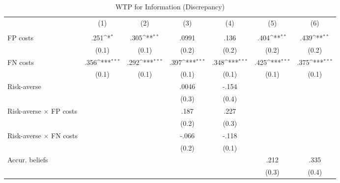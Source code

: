 \begin{table}[htbp]\centering
\def\sym#1{\ifmmode^{#1}\else\(^{#1}\)\fi}
\caption{WTP for Information (Discrepancy)}
\begin{tabular}{l*{6}{c}}
\hline\hline
                &\multicolumn{1}{c}{(1)}&\multicolumn{1}{c}{(2)}&\multicolumn{1}{c}{(3)}&\multicolumn{1}{c}{(4)}&\multicolumn{1}{c}{(5)}&\multicolumn{1}{c}{(6)}\\
                &\multicolumn{1}{c}{}&\multicolumn{1}{c}{}&\multicolumn{1}{c}{}&\multicolumn{1}{c}{}&\multicolumn{1}{c}{}&\multicolumn{1}{c}{}\\
\hline
FP costs        &     .251\sym{*}  &     .305\sym{**} &    .0991         &     .136         &     .404\sym{**} &     .439\sym{**} \\
                &    (0.1)         &    (0.1)         &    (0.2)         &    (0.2)         &    (0.2)         &    (0.2)         \\
FN costs        &     .356\sym{***}&     .292\sym{***}&     .397\sym{***}&     .348\sym{***}&     .425\sym{***}&     .375\sym{***}\\
                &    (0.1)         &    (0.1)         &    (0.1)         &    (0.1)         &    (0.1)         &    (0.1)         \\
Risk-averse     &                  &                  &    .0046         &    -.154         &                  &                  \\
                &                  &                  &    (0.3)         &    (0.4)         &                  &                  \\
Risk-averse $\times$ FP costs&                  &                  &     .187         &     .227         &                  &                  \\
                &                  &                  &    (0.2)         &    (0.3)         &                  &                  \\
Risk-averse $\times$ FN costs&                  &                  &    -.066         &    -.118         &                  &                  \\
                &                  &                  &    (0.2)         &    (0.1)         &                  &                  \\
Accur. beliefs  &                  &                  &                  &                  &     .212         &     .335         \\
                &                  &                  &                  &                  &    (0.3)         &    (0.4)         \\

\end{tabular}
\end{table}
